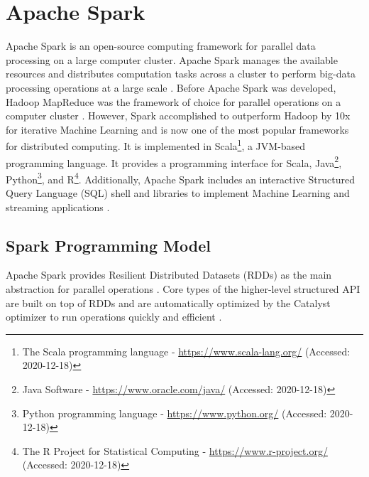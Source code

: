 \section{Apache Spark}
\label{sec:04_spark}
Apache Spark is an open-source computing framework for parallel data processing on a large computer cluster. Apache Spark manages the available resources and distributes computation tasks across a cluster to perform big-data processing operations at a large scale \cite{Chambers2018Spark}. Before Apache Spark was developed, Hadoop MapReduce \cite{Dean2010MapReduce} was the framework of choice for parallel operations on a computer cluster \cite{Zaharia2010Spark}. However, Spark accomplished to outperform Hadoop by 10x for iterative Machine Learning \cite{Zaharia2010Spark} and is now one of the most popular frameworks for distributed computing. It is implemented in Scala\footnote{The Scala programming language - \url{https://www.scala-lang.org/} (Accessed: 2020-12-18)}, a JVM-based programming language. It provides a programming interface for Scala, Java\footnote{Java Software - \url{https://www.oracle.com/java/} (Accessed: 2020-12-18)}, Python\footnote{Python programming language - \url{https://www.python.org/} (Accessed: 2020-12-18)}, and R\footnote{The R Project for Statistical Computing - \url{https://www.r-project.org/} (Accessed: 2020-12-18)}. Additionally, Apache Spark includes an interactive Structured Query Language (SQL) shell and libraries to implement Machine Learning and streaming applications \cite{Chambers2018Spark}.


\subsection{Spark Programming Model}
\label{subsec:04_spark_pr-model}
Apache Spark provides Resilient Distributed Datasets (RDDs) as the main abstraction for parallel operations \cite{Zaharia2010Spark}. Core types of the higher-level structured API are built on top of RDDs and are automatically optimized by the Catalyst optimizer to run operations quickly and efficient \cite{Chambers2018Spark, Hien2018Spark}.


